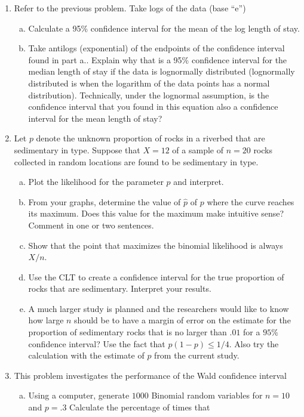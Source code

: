 \documentclass[12pt]{article}
\begin{document}
\begin{enumerate}[Problem 1.]
\begin{enumerate}[a.]
\end{enumerate}
\item Refer to the previous problem. Take logs of the data (base ``e'')
  \begin{enumerate}[a.]
  \item  Calculate a 95\% confidence interval for the mean of the log length of stay.
  \item Take antilogs (exponential) of the endpoints of the
    confidence interval found in part a..  Explain why that is a
    95\% confidence interval for the median length of stay if the data
    is lognormally distributed (lognormally distributed is when the
    logarithm of the data points has a normal distribution).
    Technically, under the lognormal assumption, is the confidence
    interval that you found in this equation also a confidence interval for
    the mean length of stay?
  \end{enumerate}
\item  Let $p$ denote the unknown proportion of rocks in a riverbed
  that are sedimentary in type.  Suppose that $X = 12$ of a sample of
  $n = 20$ rocks collected in random locations are found to be
  sedimentary in type.
\begin{enumerate}[a.]
\item Plot the likelihood for the parameter $p$ and interpret.
\item From your graphs, determine the value of $\hat{p}$ of $p$ where
  the curve reaches its maximum.  Does this value for the maximum make
 intuitive sense?  Comment in one or two sentences.
\item Show that the point that maximizes the binomial likelihood is always $X/n$.
\item Use the CLT to create a confidence interval for the true
  proportion of rocks that are sedimentary. Interpret your results.
\item A much larger study is planned and the researchers would like to
  know how large $n$ should be to have a margin of error on the
  estimate for the proportion of sedimentary rocks that is no larger
  than $.01$ for a $95\%$ confidence interval? Use the fact that $p(1
  - p) \leq 1/4$. Also try the calculation with the estimate of $p$
  from the current study.
\end{enumerate}
\item This problem investigates the performance of the Wald confidence interval
\begin{enumerate}[a.]
\item Using a computer, generate $1000$ Binomial random variables for $n=10$ and $p =.3$ Calculate the percentage of times that

\end{enumerate}
\end{enumerate}
\end{document}
